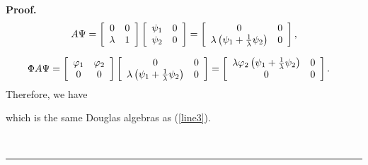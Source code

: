 \documentclass[10pt,a4paper]{amsart}
\newenvironment{proof}[1][Proof]{\noindent\textbf{#1.} }{\ \rule{0.5em}{0.5em}}
\begin{document}
\begin{proof}
\begin{align}
A\Psi= \left[
\begin{array}
[c]{cc}%
0 & 0\\
\lambda & 1
\end{array}
\right]  \left[
\begin{array}
[c]{cc}%
\psi_{1} & 0\\
\psi_{2} & 0
\end{array}
\right]  =\left[
\begin{array}
[c]{cc}%
0 & 0\\
\lambda\left(  \psi_{1}+\frac{1}{\lambda}\psi_{2}\right)  & 0
\end{array}
\right]  ,\nonumber
\end{align}
%

\begin{align}
\Phi A\Psi &  =\left[
\begin{array}
[c]{cc}%
\varphi_{1} & \varphi_{2}\\
0 & 0
\end{array}
\right]  \left[
\begin{array}
[c]{cc}%
0 & 0\\
\lambda\left(  \psi_{1}+\frac{1}{\lambda}\psi_{2}\right)  & 0
\end{array}
\right]  =\left[
\begin{array}
[c]{cc}%
\lambda\varphi_{2} \left(  \psi_{1}+\frac{1}{\lambda}\psi_{2}\right)  & 0\\
0 & 0
\end{array}
\right]  .\nonumber
\end{align}
Therefore, we have 
which is the same Douglas algebras as (\ref{line3}).


\end{proof}
\end{document}
